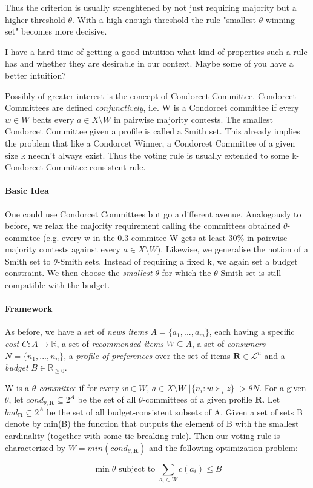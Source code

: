\documentclass[10pt,a4paper]{article}
\begin{document}
Thus the criterion is usually strenghtened by not just requiring majority but a higher threshold $\theta$. With a high enough threshold the rule
"smallest $\theta$-winning set" becomes more decisive.

I have a hard time of getting a good intuition what kind of properties such a rule has and whether they are desirable in our context. Maybe some
of you have a better intuition?

Possibly of greater interest is the concept of Condorcet Committee. Condorcet Committees are defined \emph{conjunctively}, i.e. W is a Condorcet
committee if every $w\in W$ beats every $a\in X\setminus W$ in pairwise majority contests. The smallest Condorcet Committee given a profile is
called a Smith set. This already implies the problem that like a Condorcet Winner, a Condorcet Committee of a given size k needn't always exist.
Thus the voting rule is usually extended to some k-Condorcet-Committee consistent rule.

\paragraph{Basic Idea}

One could use Condorcet Committees but go a different avenue. Analogously to before, we relax the majority requirement calling the committees
obtained $\theta$-commitee (e.g. every w in the $0.3$-commitee W gets at least 30\% in pairwise majority contests against every $a\in X\setminus
W$). Likewise, we generalise the notion of a Smith set to $\theta$-Smith sets. Instead of requiring a fixed k, we again set a budget constraint.
We then choose the \emph{smallest} $\theta$ for which the $\theta$-Smith set is still compatible with the budget.

\paragraph{Framework}

As before, we have a set of \emph{news items} $A=\{a_1,...,a_m\}$, each having a specific \emph{cost} $C: A\rightarrow \mathbb{R}$, a set of
\emph{recommended items} $W\subseteq A$, a set of \emph{consumers} $N=\{n_1,...,n_n\}$, a \emph{profile of preferences} over the set of items
$\mathbf{R}\in \mathcal{L}^n$ and a \emph{budget} $B\in \mathbb{R}_{\geq 0}$.

W is a \emph{$\theta$-committee} if for every $w\in W$, $a\in X\setminus W$ $|\{n_i:w\succ_i z\}|>\theta N$. For a given $\theta$, let
$cond_{\theta,\mathbf{R}}\subseteq 2^A$ be the set of all $\theta$-committees of a given profile $\mathbf{R}$. Let $bud_\mathbf{R}\subseteq 2^A$
be the set of all budget-consistent subsets of A. Given a set of sets B denote by min(B) the function that outputs the element of B with the
smallest cardinality (together with some tie breaking rule). Then our voting rule is characterized by $W=min(cond_{\theta,\mathbf{R}})$ and the
following optimization problem:

\[\min \theta \text{ subject to } \sum_{a_i\in W}c(a_i)\leq B\]
\end{document}
